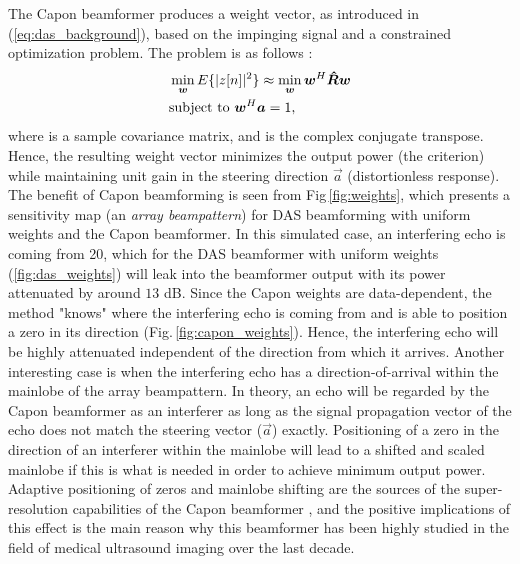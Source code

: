 The Capon beamformer produces a weight vector, as introduced in (\ref{eq:das_background}), based on the impinging signal and a constrained optimization problem. The problem is as follows \cite{Capon1969}:
\begin{align}
&\min_{\boldsymbol{w}} E\{|z[n]|^2\} \approx \min_{\boldsymbol{w}} \boldsymbol{w}^H \boldsymbol{\hat{R}} \boldsymbol{w} \label{eq:capon_optimization_criteria_background} \\
&\text{subject to } \boldsymbol{w}^H\boldsymbol{a} = 1,\notag
\end{align}
where  is a sample covariance matrix, and  is the complex conjugate transpose. Hence, the resulting weight vector minimizes the output power (the criterion) while maintaining unit gain in the steering direction $\vec{a}$ (distortionless response). The benefit of Capon beamforming is seen from Fig\,\ref{fig:weights}, which presents a sensitivity map (an \textit{array beampattern}) for DAS beamforming with uniform weights and the Capon beamformer. In this simulated case, an interfering echo is coming from 20\degree{}, which for the DAS beamformer with uniform weights (\ref{fig:das_weights}) will leak into the beamformer output with its power attenuated by around $13$ dB. Since the Capon weights are data-dependent, the method "knows" where the interfering echo is coming from and is able to position a zero in its direction (Fig.\,\ref{fig:capon_weights}). Hence, the interfering echo will be highly attenuated independent of the direction from which it arrives. Another interesting case is when the interfering echo has a direction-of-arrival within the mainlobe of the array beampattern. In theory, an echo will be regarded by the Capon beamformer as an interferer as long as the signal propagation vector of the echo does not match the steering vector ($\vec{a}$) exactly. Positioning of a zero in the direction of an interferer within the mainlobe will lead to a shifted and scaled mainlobe if this is what is needed in order to achieve minimum output power. Adaptive positioning of zeros and mainlobe shifting are the sources of the super-resolution capabilities of the Capon beamformer \cite{Synnevag2007}, and the positive implications of this effect \cite{Synnevag2009} is the main reason why this beamformer has been highly studied in the field of medical ultrasound imaging over the last decade.

